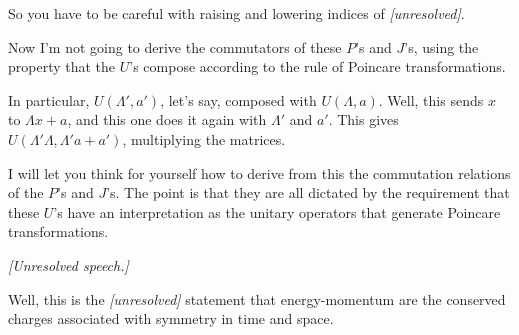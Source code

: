 So you have to be careful with raising and lowering indices of
\textit{[unresolved]}.

Now I'm not going to derive
the commutators of these $P$'s and $J$'s, using the property that the $U$'s
compose according to the rule of Poincare transformations.

In particular, $U(\Lambda',a')$, let's say, composed with $U(\Lambda,a)$.
Well, this sends $x$ to $\Lambda x+a$, and
this one does it again with $\Lambda'$ and $a'$. This gives
$U(\Lambda'\Lambda,\Lambda'a+a')$, multiplying the matrices.

I will let you think for yourself how to derive from this the commutation
relations of the $P$'s and $J$'s. The point is that they are all dictated by
the requirement that these $U$'s have an interpretation as the unitary
operators that generate Poincare transformations.

\textit{[Unresolved speech.]}

Well, this is the \textit{[unresolved]} statement that energy-momentum are the
conserved charges associated with symmetry in time and space.

